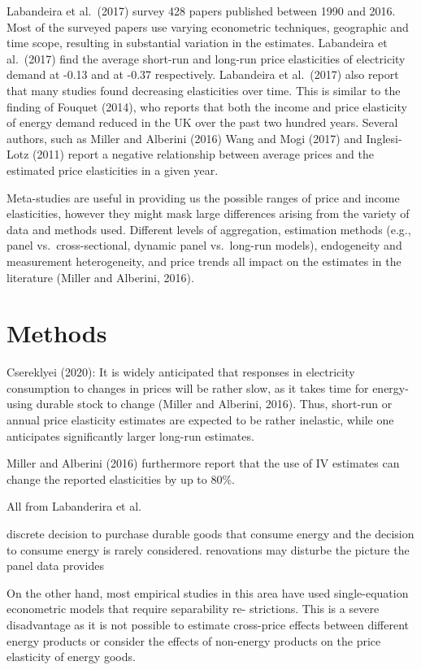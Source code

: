 \documentclass[12pt,twoside]{reedthesis}
\begin{document}
Labandeira et al.~(2017) survey 428 papers published between 1990 and 2016. Most of the surveyed papers use varying econometric techniques, geographic and time scope, resulting in substantial variation in the estimates. Labandeira et al.~(2017) find the average short-run and long-run price elasticities of electricity demand at -0.13 and at -0.37 respectively. Labandeira et al.~(2017) also report that many studies found decreasing elasticities over time. This is similar to the finding of Fouquet (2014), who reports that both the income and price elasticity of energy demand reduced in the UK over the past two hundred years. Several authors, such as Miller and Alberini (2016) Wang and Mogi (2017) and Inglesi-Lotz (2011) report a negative relationship between average prices and the estimated price elasticities in a given year.

Meta-studies are useful in providing us the possible ranges of price and income elasticities, however they might mask large differences arising from the variety of data and methods used. Different levels of aggregation, estimation methods (e.g., panel vs.~cross-sectional, dynamic panel vs.~long-run models), endogeneity and measurement heterogeneity, and price trends all impact on the estimates in the literature (Miller and Alberini, 2016).

\hypertarget{methods}{%
\chapter{Methods}\label{methods}}

Csereklyei (2020):
It is widely anticipated that responses in electricity consumption to changes in prices will be rather slow, as it takes time for energy-using durable stock to change (Miller and Alberini, 2016). Thus, short-run or annual price elasticity estimates are expected to be rather inelastic, while one anticipates significantly larger long-run estimates.

Miller and Alberini (2016) furthermore report that the use of IV estimates can change the reported elasticities by up to 80\%.

All from Labanderira et al.

discrete decision to purchase durable goods that consume energy and the decision to consume energy is rarely considered.
renovations may disturbe the picture the panel data provides

On the other hand, most empirical studies in this area have used single-equation econometric models that require separability re- strictions. This is a severe disadvantage as it is not possible to estimate cross-price effects between different energy products or consider the effects of non-energy products on the price elasticity of energy goods.
\end{document}
